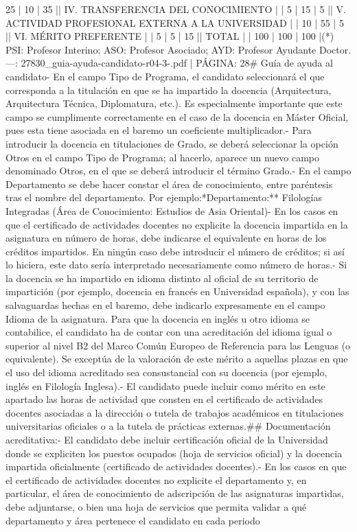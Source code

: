 \documentclass{article}
\begin{document}
\begin{itemize}
{{{25    | 10    | 35    |\n| IV. TRANSFERENCIA DEL CONOCIMIENTO                 |                             | 5     | 15    | 5     |\n| V. ACTIVIDAD PROFESIONAL EXTERNA A LA UNIVERSIDAD  |                             | 10    | 55    | 5     |\n| VI. MÉRITO PREFERENTE                              |                             | 5     | 5     | 15    |\n| TOTAL                                             |                             | 100   | 100   | 100   |\n\n(*) PSI: Profesor Interino; ASO: Profesor Asociado; AYD: Profesor Ayudante Doctor.\n\n---\n\nFUENTE: 27830_guia-ayuda-candidato-r04-3-.pdf | PÁGINA: 28\n# Guía de ayuda al candidato\n\n- En el campo Tipo de Programa, el candidato seleccionará el que corresponda a la titulación en que se ha impartido la docencia (Arquitectura, Arquitectura Técnica, Diplomatura, etc.). Es especialmente importante que este campo se cumplimente correctamente en el caso de la docencia en Máster Oficial, pues esta tiene asociada en el baremo un coeficiente multiplicador.\n- Para introducir la docencia en titulaciones de Grado, se deberá seleccionar la opción Otros en el campo Tipo de Programa; al hacerlo, aparece un nuevo campo denominado Otros, en el que se deberá introducir el término Grado.\n- En el campo Departamento se debe hacer constar el área de conocimiento, entre paréntesis tras el nombre del departamento. Por ejemplo:\n**Departamento:** Filologías Integradas (Área de Conocimiento: Estudios de Asia Oriental)\n- En los casos en que el certificado de actividades docentes no explicite la docencia impartida en la asignatura en número de horas, debe indicarse el equivalente en horas de los créditos impartidos. En ningún caso debe introducir el número de créditos; si así lo hiciera, este dato sería interpretado necesariamente como número de horas.\n- Si la docencia se ha impartido en idioma distinto al oficial de su territorio de impartición (por ejemplo, docencia en francés en Universidad española), y con las salvaguardas hechas en el baremo, debe indicarlo expresamente en el campo Idioma de la asignatura. Para que la docencia en inglés u otro idioma se contabilice, el candidato ha de contar con una acreditación del idioma igual o superior al nivel B2 del Marco Común Europeo de Referencia para las Lenguas (o equivalente). Se exceptúa de la valoración de este mérito a aquellas plazas en que el uso del idioma acreditado sea consustancial con su docencia (por ejemplo, inglés en Filología Inglesa).\n- El candidato puede incluir como mérito en este apartado las horas de actividad que consten en el certificado de actividades docentes asociadas a la dirección o tutela de trabajos académicos en titulaciones universitarias oficiales o a la tutela de prácticas externas.\n\n## Documentación acreditativa:\n\n- El candidato debe incluir certificación oficial de la Universidad donde se expliciten los puestos ocupados (hoja de servicios oficial) y la docencia impartida oficialmente (certificado de actividades docentes).\n- En los casos en que el certificado de actividades docentes no explicite el departamento y, en particular, el área de conocimiento de adscripción de las asignaturas impartidas, debe adjuntarse, o bien una hoja de servicios que permita validar a qué departamento y área pertenece el candidato en cada periodo }}}
\end{itemize}
\end{document}
